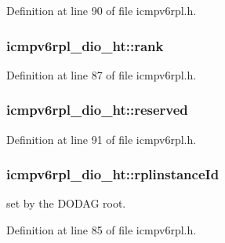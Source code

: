 Definition at line 90 of file icmpv6rpl.\+h.

\subsubsection[{\texorpdfstring{rank}{rank}}]{ icmpv6rpl\+\_\+dio\+\_\+ht\+::rank}\hypertarget{structicmpv6rpl__dio__ht_a06c8c645055fefe26b675d9e4c1c1566}{}\label{structicmpv6rpl__dio__ht_a06c8c645055fefe26b675d9e4c1c1566}


Definition at line 87 of file icmpv6rpl.\+h.

\subsubsection[{\texorpdfstring{reserved}{reserved}}]{ icmpv6rpl\+\_\+dio\+\_\+ht\+::reserved}\hypertarget{structicmpv6rpl__dio__ht_af85e57d60eb429c93011d35faf0581d2}{}\label{structicmpv6rpl__dio__ht_af85e57d60eb429c93011d35faf0581d2}


Definition at line 91 of file icmpv6rpl.\+h.

\subsubsection[{\texorpdfstring{rplinstance\+Id}{rplinstanceId}}]{ icmpv6rpl\+\_\+dio\+\_\+ht\+::rplinstance\+Id}\hypertarget{structicmpv6rpl__dio__ht_a00ec0515587fab9425046498de9924bc}{}\label{structicmpv6rpl__dio__ht_a00ec0515587fab9425046498de9924bc}


set by the D\+O\+D\+AG root. 



Definition at line 85 of file icmpv6rpl.\+h.

